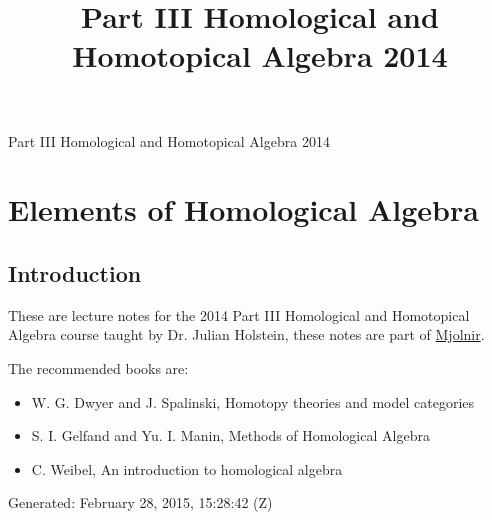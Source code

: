 \documentclass[10pt,]{book}
\title{Part III Homological and Homotopical Algebra 2014}
\author{}
\date{}
\theoremstyle{plain}
\theoremstyle{definition}
\numberwithin{equation}{section}
\begin{document}
\frontmatter
\thispagestyle{empty}
\begin{center}
{\Huge Part III Homological and Homotopical Algebra 2014}
\end{center}\par
{}
\clearpage
\thispagestyle{empty}
\clearpage
\maketitle
\clearpage
\thispagestyle{empty}
\clearpage
\setcounter{tocdepth}{1}
\renewcommand*\contentsname{Contents}
\tableofcontents
\mainmatter
\typeout{************************************************}
\typeout{************************************************}
\chapter[Elements of Homological Algebra]{Elements of Homological Algebra}\label{chap-hom-alg}
\typeout{************************************************}
\typeout{************************************************}
\section[Introduction]{Introduction}\label{sec-introduction}
These are lecture notes for the 2014 Part III Homological and Homotopical Algebra course taught by Dr. Julian Holstein, these notes are part of \href{https://alexjbest.github.io/mjolnir/}{Mjolnir}.%
\par
The recommended books are: 
          \begin{itemize}
\item{}W. G. Dwyer and J. Spalinski, Homotopy theories and model categories\item{}S. I. Gelfand and Yu. I. Manin, Methods of Homological Algebra\item{}C. Weibel, An introduction to homological algebra\end{itemize}

\par

          Generated: February 28, 2015, 15:28:42 (Z)
\typeout{************************************************}
\typeout{************************************************}
\end{document}
